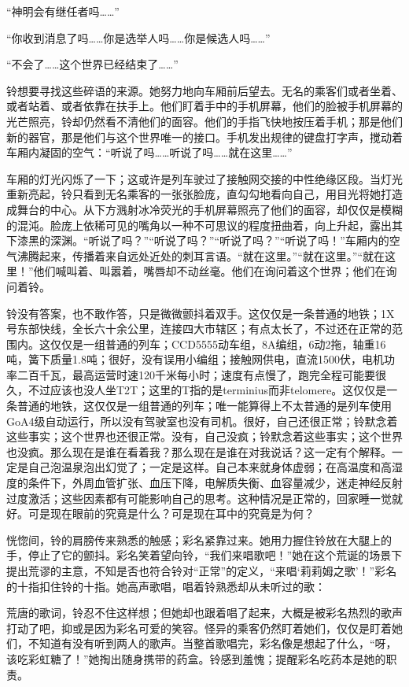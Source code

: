 “神明会有继任者吗……”

“你收到消息了吗……你是选举人吗……你是候选人吗……”

“不会了……这个世界已经结束了……”

铃想要寻找这些碎语的来源。她努力地向车厢前后望去。无名的乘客们或者坐着、或者站着、或者依靠在扶手上。他们盯着手中的手机屏幕，他们的脸被手机屏幕的光芒照亮，铃却仍然看不清他们的面容。他们的手指飞快地按压着手机；那是他们新的器官，那是他们与这个世界唯一的接口。手机发出规律的键盘打字声，搅动着车厢内凝固的空气：“听说了吗……听说了吗……就在这里……”

车厢的灯光闪烁了一下；这或许是列车驶过了接触网交接的中性绝缘区段。当灯光重新亮起，铃只看到无名乘客的一张张脸庞，直勾勾地看向自己，用目光将她打造成舞台的中心。从下方溅射冰冷荧光的手机屏幕照亮了他们的面容，却仅仅是模糊的混沌。脸庞上依稀可见的嘴角以一种不可思议的程度扭曲着，向上升起，露出其下漆黑的深渊。“听说了吗？”“听说了吗？”“听说了吗？”“听说了吗！”车厢内的空气沸腾起来，传播着来自远处近处的刺耳言语。“就在这里。”“就在这里。”“就在这里！”他们喊叫着、叫嚣着，嘴唇却不动丝毫。他们在询问着这个世界；他们在询问着铃。

铃没有答案，也不敢作答，只是微微颤抖着双手。这仅仅是一条普通的地铁；1X号东部快线，全长六十余公里，连接四大市辖区；有点太长了，不过还在正常的范围内。这仅仅是一组普通的列车；CCD5555动车组，8A编组，6动2拖，轴重16吨，簧下质量1.8吨；很好，没有误用小编组；接触网供电，直流1500伏，电机功率二百千瓦，最高运营时速120千米每小时；速度有点慢了，跑完全程可能要很久，不过应该也没人坐T2T；这里的T指的是terminius而非telomere。这仅仅是一条普通的地铁，这仅仅是一组普通的列车；唯一能算得上不太普通的是列车使用GoA4级自动运行，所以没有驾驶室也没有司机。很好，自己还很正常；铃默念着这些事实；这个世界也还很正常。没有，自己没疯；铃默念着这些事实；这个世界也没疯。那么现在是谁在看着我？那么现在是谁在对我说话？这一定有个解释。一定是自己泡温泉泡出幻觉了；一定是这样。自己本来就身体虚弱；在高温度和高湿度的条件下，外周血管扩张、血压下降，电解质失衡、血容量减少，迷走神经反射过度激活；这些因素都有可能影响自己的思考。这种情况是正常的，回家睡一觉就好。可是现在眼前的究竟是什么？可是现在耳中的究竟是为何？

恍惚间，铃的肩膀传来熟悉的触感；彩名紧靠过来。她用力握住铃放在大腿上的手，停止了它的颤抖。彩名笑着望向铃，“我们来唱歌吧！”她在这个荒诞的场景下提出荒谬的主意，不知是否也符合铃对“正常”的定义，“来唱‘莉莉姆之歌’！”彩名的十指扣住铃的十指。她高声歌唱，唱着铃熟悉却从未听过的歌：


荒唐的歌词，铃忍不住这样想；但她却也跟着唱了起来，大概是被彩名热烈的歌声打动了吧，抑或是因为彩名可爱的笑容。怪异的乘客仍然盯着她们，仅仅是盯着她们，不知道有没有听到两人的歌声。当整首歌唱完，彩名像是想起了什么，“呀，该吃彩虹糖了！”她掏出随身携带的药盒。铃感到羞愧；提醒彩名吃药本是她的职责。

